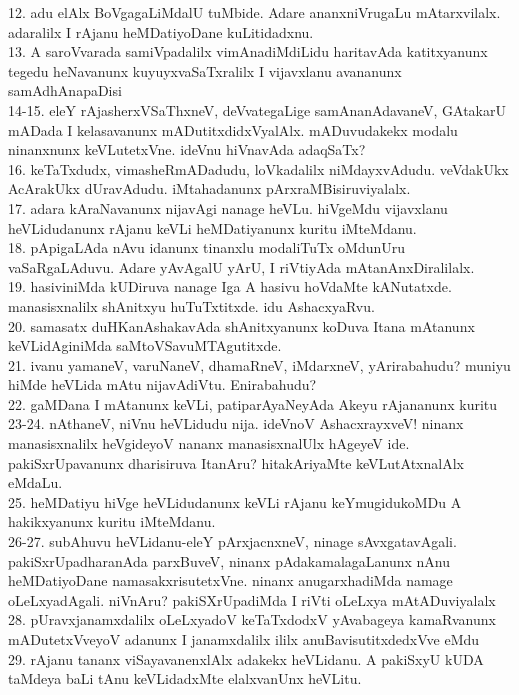 \documentclass{article}
\begin{document}
12. adu elAlx BoVgagaLiMdalU tuMbide. Adare ananxniVrugaLu mAtarxvilalx. adaralilx I   rAjanu heMDatiyoDane kuLitidadxnu.\\
13. A saroVvarada samiVpadalilx vimAnadiMdiLidu haritavAda katitxyanunx tegedu heNavanunx kuyuyxvaSaTxralilx I vijavxlanu avananunx samAdhAnapaDisi\\
14-15. eleY rAjasherxVSaThxneV, deVvategaLige samAnanAdavaneV, GAtakarU mADada I kelasavanunx mADutitxdidxVyalAlx. mADuvudakekx modalu ninanxnunx keVLutetxVne. ideVnu hiVnavAda adaqSaTx?\\
16. keTaTxdudx, vimasheRmADadudu, loVkadalilx niMdayxvAdudu. veVdakUkx AcArakUkx dUravAdudu. iMtahadanunx pArxraMBisiruviyalalx.\\
17. adara kAraNavanunx nijavAgi nanage heVLu. hiVgeMdu vijavxlanu heVLidudanunx rAjanu keVLi heMDatiyanunx kuritu iMteMdanu.\\
18. pApigaLAda nAvu idanunx tinanxlu modaliTuTx oMdunUru vaSaRgaLAduvu. Adare yAvAgalU yArU, I riVtiyAda mAtanAnxDiralilalx.\\
19. hasiviniMda kUDiruva nanage Iga A hasivu hoVdaMte kANutatxde. manasisxnalilx shAnitxyu huTuTxtitxde. idu AshacxyaRvu.\\
20. samasatx duHKanAshakavAda shAnitxyanunx koDuva Itana mAtanunx keVLidAginiMda saMtoVSavuMTAgutitxde.\\
21. ivanu yamaneV, varuNaneV, dhamaRneV, iMdarxneV, yArirabahudu? muniyu hiMde heVLida mAtu     nijavAdiVtu. Enirabahudu?\\
22. gaMDana I mAtanunx keVLi, patiparAyaNeyAda Akeyu rAjananunx kuritu\\
23-24. nAthaneV, niVnu heVLidudu nija. ideVnoV AshacxrayxveV! ninanx manasisxnalilx heVgideyoV nananx manasisxnalUlx hAgeyeV ide. pakiSxrUpavanunx dharisiruva ItanAru? hitakAriyaMte keVLutAtxnalAlx eMdaLu.\\
25. heMDatiyu hiVge heVLidudanunx keVLi rAjanu keYmugidukoMDu A hakikxyanunx kuritu iMteMdanu.\\
26-27. subAhuvu heVLidanu-eleY pArxjacnxneV, ninage sAvxgatavAgali. pakiSxrUpadharanAda parxBuveV, ninanx pAdakamalagaLanunx nAnu heMDatiyoDane namasakxrisutetxVne. ninanx anugarxhadiMda namage oLeLxyadAgali. niVnAru? pakiSXrUpadiMda I  riVti oLeLxya mAtADuviyalalx\\
28. pUravxjanamxdalilx oLeLxyadoV keTaTxdodxV yAvabageya kamaRvanunx mADutetxVveyoV adanunx I janamxdalilx ililx anuBavisutitxdedxVve eMdu\\
29. rAjanu tananx viSayavanenxlAlx adakekx heVLidanu. A pakiSxyU kUDA taMdeya baLi tAnu keVLidadxMte elalxvanUnx heVLitu.\\
\end{document}
